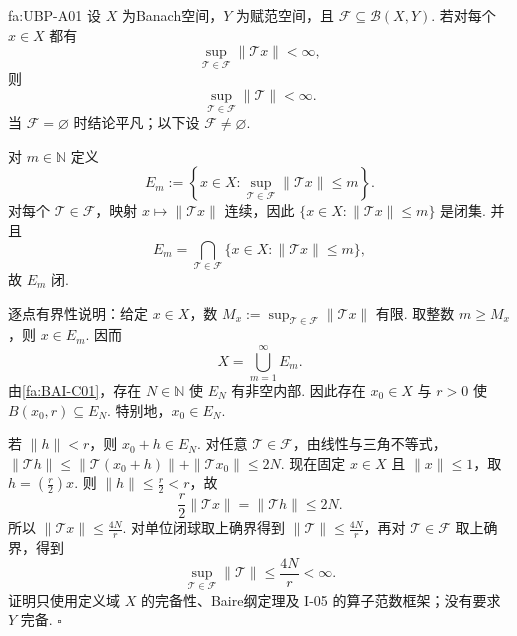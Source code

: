 \begin{FATheorem}{fa:UBP-A01}
设 \(\displaystyle X\) 为Banach空间，\(\displaystyle Y\) 为赋范空间，且 \(\displaystyle \mathcal F\subseteq\mathcal B(X,Y)\). 若对每个 \(\displaystyle x\in X\) 都有
\[
\sup_{\mathcal T\in\mathcal F}\|\mathcal T x\|<\infty,
\]
则
\[
\sup_{\mathcal T\in\mathcal F}\|\mathcal T\|<\infty.
\]
当 \(\displaystyle \mathcal F=\varnothing\) 时结论平凡；以下设 \(\displaystyle \mathcal F\neq\varnothing\).
\end{FATheorem}

\begin{FAProof}
对 \(\displaystyle m\in\mathbb N\) 定义
\[
E_m:=\left\{x\in X:\sup_{\mathcal T\in\mathcal F}\|\mathcal T x\|\leqslant m\right\}.
\]
对每个 \(\displaystyle \mathcal T\in\mathcal F\)，映射 \(\displaystyle x\mapsto\|\mathcal T x\|\) 连续，因此
\(\displaystyle \{x\in X:\|\mathcal T x\|\leqslant m\}\)
是闭集. 并且
\[
E_m
=\bigcap_{\mathcal T\in\mathcal F}
\{x\in X:\|\mathcal T x\|\leqslant m\},
\]
故 \(\displaystyle E_m\) 闭.

逐点有界性说明：给定 \(\displaystyle x\in X\)，数 \(\displaystyle M_x:=\sup_{\mathcal T\in\mathcal F}\|\mathcal T x\|\) 有限. 取整数 \(\displaystyle m\geqslant M_x\)，则 \(\displaystyle x\in E_m\). 因而
\[
X=\bigcup_{m=1}^{\infty}E_m.
\]
由\autoref{fa:BAI-C01}，存在 \(\displaystyle N\in\mathbb N\) 使 \(\displaystyle E_N\) 有非空内部. 因此存在 \(\displaystyle x_0\in X\) 与 \(\displaystyle r>0\) 使
\(\displaystyle B(x_0,r)\subseteq E_N\).
特别地，\(\displaystyle x_0\in E_N\).

若 \(\displaystyle \|h\|<r\)，则 \(\displaystyle x_0+h\in E_N\). 对任意 \(\displaystyle \mathcal T\in\mathcal F\)，由线性与三角不等式，
\(\displaystyle \|\mathcal T h\| \leqslant\|\mathcal T(x_0+h)\|+\|\mathcal T x_0\| \leqslant2N\).
现在固定 \(\displaystyle x\in X\) 且 \(\displaystyle \|x\|\leqslant1\)，取 \(\displaystyle h=(\frac{r}{2})x\). 则 \(\displaystyle \|h\|\leqslant \frac{r}{2}<r\)，故
\[
\frac{r}{2}\|\mathcal T x\|
=\|\mathcal T h\|
\leqslant2N.
\]
所以 \(\displaystyle \|\mathcal T x\|\leqslant\frac{4N}{r}\). 对单位闭球取上确界得到 \(\displaystyle \|\mathcal T\|\leqslant\frac{4N}{r}\)，再对 \(\displaystyle \mathcal T\in\mathcal F\) 取上确界，得到
\[
\sup_{\mathcal T\in\mathcal F}\|\mathcal T\|
\leqslant\frac{4N}{r}
<\infty.
\]
证明只使用定义域 \(\displaystyle X\) 的完备性、Baire纲定理及 I-05 的算子范数框架；没有要求 \(\displaystyle Y\) 完备.
\hfill\(\square\)
\end{FAProof}

